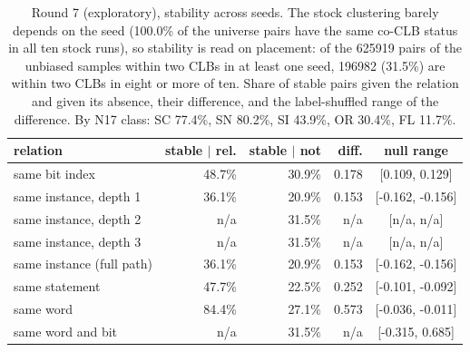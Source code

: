 \begin{table}[t]
\caption{Round 7 (exploratory), stability across seeds. The stock clustering barely depends on the seed (100.0\% of the universe pairs have the same co-CLB status in all ten stock runs), so stability is read on placement: of the 625919 pairs of the unbiased samples within two CLBs in at least one seed, 196982 (31.5\%) are within two CLBs in eight or more of ten. Share of stable pairs given the relation and given its absence, their difference, and the label-shuffled range of the difference. By N17 class: SC 77.4\%, SN 80.2\%, SI 43.9\%, OR 30.4\%, FL 11.7\%.}
\label{tab:r7stab}
\centering\scriptsize
\begin{tabular}{@{}lrrrc@{}}
\toprule
relation & stable $|$ rel. & stable $|$ not & diff. & null range \\
\midrule
same bit index & 48.7\% & 30.9\% & 0.178 & [0.109, 0.129] \\
same instance, depth 1 & 36.1\% & 20.9\% & 0.153 & [-0.162, -0.156] \\
same instance, depth 2 & n/a & 31.5\% & n/a & [n/a, n/a] \\
same instance, depth 3 & n/a & 31.5\% & n/a & [n/a, n/a] \\
same instance (full path) & 36.1\% & 20.9\% & 0.153 & [-0.162, -0.156] \\
same statement & 47.7\% & 22.5\% & 0.252 & [-0.101, -0.092] \\
same word & 84.4\% & 27.1\% & 0.573 & [-0.036, -0.011] \\
same word and bit & n/a & 31.5\% & n/a & [-0.315, 0.685] \\
\bottomrule
\end{tabular}
\end{table}

